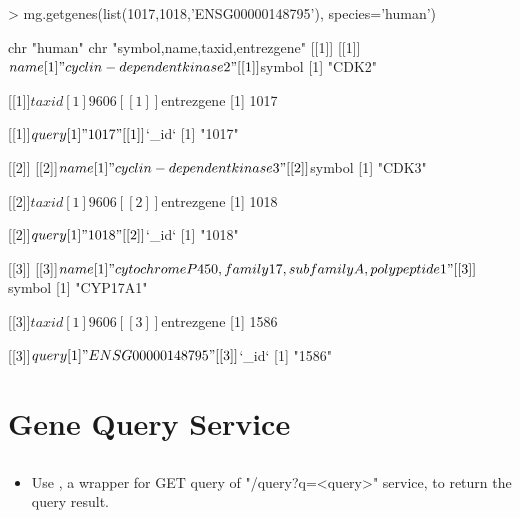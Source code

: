 \documentclass[12pt]{article}
\begin{document}
\begin{Schunk}
\begin{Sinput}
> mg.getgenes(list(1017,1018,'ENSG00000148795'), species='human')
\end{Sinput}
\begin{Soutput}
 chr "human"
 chr "symbol,name,taxid,entrezgene"
[[1]]
[[1]]$name
[1] "cyclin-dependent kinase 2"

[[1]]$symbol
[1] "CDK2"

[[1]]$taxid
[1] 9606

[[1]]$entrezgene
[1] 1017

[[1]]$query
[1] "1017"

[[1]]$`_id`
[1] "1017"


[[2]]
[[2]]$name
[1] "cyclin-dependent kinase 3"

[[2]]$symbol
[1] "CDK3"

[[2]]$taxid
[1] 9606

[[2]]$entrezgene
[1] 1018

[[2]]$query
[1] "1018"

[[2]]$`_id`
[1] "1018"


[[3]]
[[3]]$name
[1] "cytochrome P450, family 17, subfamily A, polypeptide 1"

[[3]]$symbol
[1] "CYP17A1"

[[3]]$taxid
[1] 9606

[[3]]$entrezgene
[1] 1586

[[3]]$query
[1] "ENSG00000148795"

[[3]]$`_id`
[1] "1586"
\end{Soutput}
\end{Schunk}


\section{Gene Query Service}

\subsection{}

\begin{itemize}
\item Use , a wrapper for GET query of "/query?q=<query>" service, to return  the query result.
\end{itemize}
\end{document}
